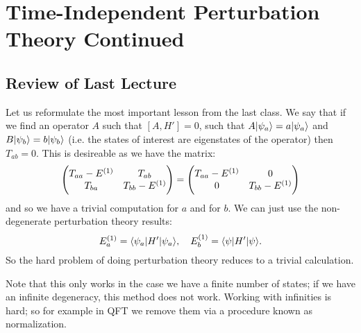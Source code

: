 \section{Time-Independent Perturbation Theory Continued}
\subsection{Review of Last Lecture}
Let us reformulate the most important lesson from the last class. We say that if we find an operator $A$ such that $[A, H'] = 0$, such that $A\lvert \psi_a \rangle = a\lvert \psi_a \rangle$ and $B\lvert \psi_b \rangle = b\lvert \psi_b \rangle$ (i.e. the states of interest are eigenstates of the operator) then $T_{ab} = 0$. This is desireable as we have the matrix:
\begin{equation}
    \begin{pmatrix}T_{aa} - E^{(1)} & T_{ab} \\ T_{ba} & T_{bb} - E^{(1)}\end{pmatrix} =  \begin{pmatrix}T_{aa} - E^{(1)} & 0 \\ 0 & T_{bb} - E^{(1)}\end{pmatrix} 
\end{equation}
and so we have a trivial computation for $a$ and for $b$. We can just use the non-degenerate perturbation theory results:
\begin{equation}
    E_{a}^{(1)} = \langle \psi_a \rvert H'\lvert \psi_a \rangle, \quad E_b^{(1)} = \langle \psi \rvert H'\lvert \psi \rangle.
\end{equation}
So the hard problem of doing perturbation theory reduces to a trivial calculation.

Note that this only works in the case we have a finite number of states; if we have an infinite degeneracy, this method does not work. Working with infinities is hard; so for example in QFT we remove them via a procedure known as normalization.

